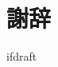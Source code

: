 \documentclass[a4paper,twoside,12pt,papersize, dvipdfmx]{iirthesis}
\begin{document}
\fi

\chapter{謝辞}\label{chapter:acknowledgements}


\expandafter\ifx\csname ifdraft\endcsname\relax
  
\end{document}
